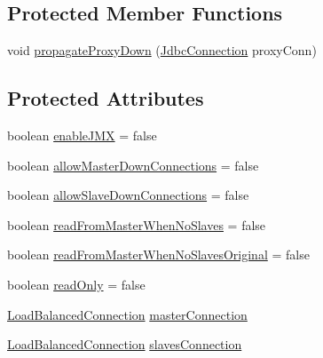 \subsection*{Protected Member Functions}
\begin{DoxyCompactItemize}
\item 
void \mbox{\hyperlink{classcom_1_1mysql_1_1cj_1_1jdbc_1_1ha_1_1_replication_connection_proxy_ad12288bce5f6b4c6cc77f11d3dfdb176}{propagate\+Proxy\+Down}} (\mbox{\hyperlink{interfacecom_1_1mysql_1_1cj_1_1jdbc_1_1_jdbc_connection}{Jdbc\+Connection}} proxy\+Conn)
\end{DoxyCompactItemize}
\subsection*{Protected Attributes}
\begin{DoxyCompactItemize}
\item 
boolean \mbox{\hyperlink{classcom_1_1mysql_1_1cj_1_1jdbc_1_1ha_1_1_replication_connection_proxy_a0f66a7dab36407a63f13770dab93e785}{enable\+J\+MX}} = false
\item 
boolean \mbox{\hyperlink{classcom_1_1mysql_1_1cj_1_1jdbc_1_1ha_1_1_replication_connection_proxy_ad78410d64c371f9b8f398bbdde87b5a0}{allow\+Master\+Down\+Connections}} = false
\item 
boolean \mbox{\hyperlink{classcom_1_1mysql_1_1cj_1_1jdbc_1_1ha_1_1_replication_connection_proxy_a5f072f55d6d82af800f2af30ccfcc90e}{allow\+Slave\+Down\+Connections}} = false
\item 
boolean \mbox{\hyperlink{classcom_1_1mysql_1_1cj_1_1jdbc_1_1ha_1_1_replication_connection_proxy_a14dac456afed0bef525e70777218bfbf}{read\+From\+Master\+When\+No\+Slaves}} = false
\item 
boolean \mbox{\hyperlink{classcom_1_1mysql_1_1cj_1_1jdbc_1_1ha_1_1_replication_connection_proxy_a58e0149191812a971ff4abbd9ca3b081}{read\+From\+Master\+When\+No\+Slaves\+Original}} = false
\item 
boolean \mbox{\hyperlink{classcom_1_1mysql_1_1cj_1_1jdbc_1_1ha_1_1_replication_connection_proxy_aed908cc85582ecb990209d20ff83e2b0}{read\+Only}} = false
\item 
\mbox{\hyperlink{interfacecom_1_1mysql_1_1cj_1_1jdbc_1_1ha_1_1_load_balanced_connection}{Load\+Balanced\+Connection}} \mbox{\hyperlink{classcom_1_1mysql_1_1cj_1_1jdbc_1_1ha_1_1_replication_connection_proxy_a565d82806f2e26fdfdd33f8e966d0ccf}{master\+Connection}}
\item 
\mbox{\hyperlink{interfacecom_1_1mysql_1_1cj_1_1jdbc_1_1ha_1_1_load_balanced_connection}{Load\+Balanced\+Connection}} \mbox{\hyperlink{classcom_1_1mysql_1_1cj_1_1jdbc_1_1ha_1_1_replication_connection_proxy_a088499dd8e50f1f2eec38a635765300a}{slaves\+Connection}}
\end{DoxyCompactItemize}


